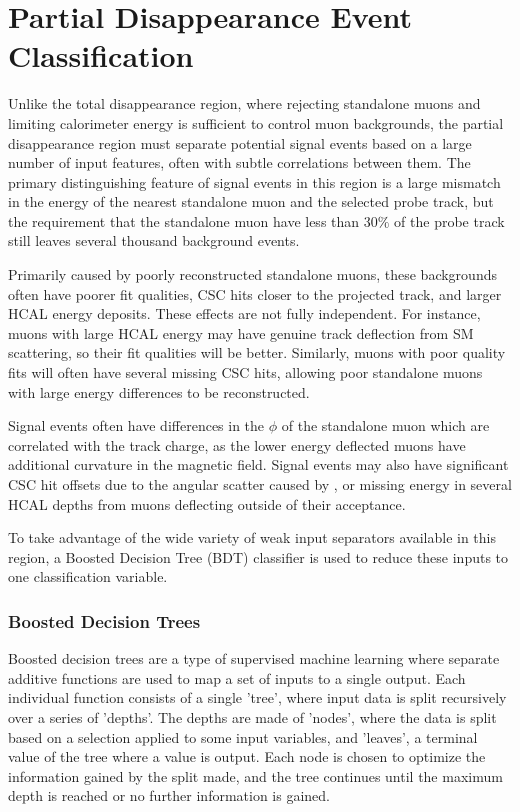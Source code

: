 \chapter{Partial Disappearance Event Classification}
Unlike the total disappearance region, where rejecting standalone muons and limiting calorimeter energy is sufficient to control muon backgrounds, the partial disappearance region must separate potential signal events based on a large number of input features, often with subtle correlations between them.
The primary distinguishing feature of signal events in this region is a large mismatch in the energy of the nearest standalone muon and the selected probe track, but the requirement that the standalone muon have less than 30$\%$ of the probe track still leaves several thousand background events.

Primarily caused by poorly reconstructed standalone muons, these backgrounds often have poorer fit qualities, CSC hits closer to the projected track, and larger HCAL energy deposits.
These effects are not fully independent.
For instance, muons with large HCAL energy may have genuine track deflection from SM scattering, so their fit qualities will be better.
Similarly, muons with poor quality fits will often have several missing CSC hits, allowing poor standalone muons with large energy differences to be reconstructed.

Signal events often have differences in the $\phi$ of the standalone muon which are correlated with the track charge, as the lower energy deflected muons have additional curvature in the magnetic field.
Signal events may also have significant CSC hit offsets due to the angular scatter caused by \dbrem, or missing energy in several HCAL depths from muons deflecting outside of their acceptance.

To take advantage of the wide variety of weak input separators available in this region, a Boosted Decision Tree (BDT) classifier is used to reduce these inputs to one classification variable.

\subsection{Boosted Decision Trees}
Boosted decision trees are a type of supervised machine learning where separate additive functions are used to map a set of inputs to a single output.
Each individual function consists of a single 'tree', where input data is split recursively over a series of 'depths'. 
The depths are made of 'nodes', where the data is split based on a selection applied to some input variables, and 'leaves', a terminal value of the tree where a value is output.
Each node is chosen to optimize the information gained by the split made, and the tree continues until the maximum depth is reached or no further information is gained.

